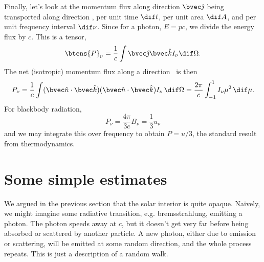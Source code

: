 Finally, let's look at the momentum flux along direction $\unitj$ being transported along direction \unitk, per unit time $\dif t$, per unit area $\dif A$, and per unit frequency interval $\dif\nu$.  Since for a photon, $E = pc$, we divide the energy flux by $c$.
This is a tensor,
\begin{equation}\label{e.radiation-pressure-tensor}
\btens{P}_{\nu} = \frac{1}{c}\int \unitj\unitk I_{\nu}\dif\Omega.
\end{equation}
The net (isotropic) momentum flux along a direction \unitn\ is then
\[ P_{\nu} = \frac{1}{c}\int (\unitn\cdot\unitk)(\unitn\cdot\unitk) I_{\nu}\,\dif \Omega = \frac{2\pi}{c}\int_{-1}^{1} I_{\nu}\mu^{2}\,\dif\mu. \]
For blackbody radiation, 
\[ P_{\nu} = \frac{4\pi}{3c} B_{\nu}  = \frac{1}{3}u_{\nu}\]
and we may integrate this over frequency to obtain $P = u/3$, the standard result from thermodynamics.

\section{Some simple estimates}

We argued in the previous section that the solar interior is quite opaque. Naively, we might imagine some radiative transition, e.g. bremsstrahlung, emitting a photon.  The photon speeds away at $c$, but it doesn't get very far before being absorbed or scattered by another particle. A new photon, either due to emission or scattering, will be emitted at some random direction, and the whole process repeats. This is just a description of a random walk. 

